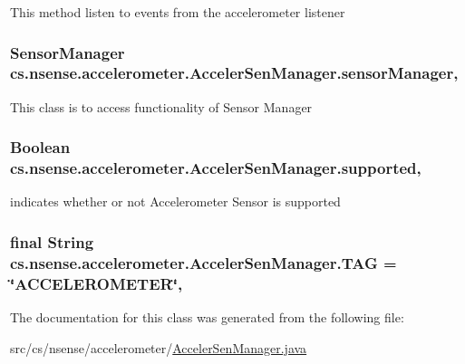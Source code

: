 This method listen to events from the accelerometer listener \hypertarget{classcs_1_1nsense_1_1accelerometer_1_1_acceler_sen_manager_a7a38912fd6f45a8d2ae42711505a1191}{
\subsubsection[{sensor\-Manager}]{\setlength{\rightskip}{0pt plus 5cm}Sensor\-Manager cs.\-nsense.\-accelerometer.\-Acceler\-Sen\-Manager.\-sensor\-Manager\hspace{0.3cm}{\ttfamily [static]}, {\ttfamily [private]}}}\label{classcs_1_1nsense_1_1accelerometer_1_1_acceler_sen_manager_a7a38912fd6f45a8d2ae42711505a1191}
This class is to access functionality of Sensor Manager \hypertarget{classcs_1_1nsense_1_1accelerometer_1_1_acceler_sen_manager_a9c170f7b3bb6edb7f36540f22e815229}{
\subsubsection[{supported}]{\setlength{\rightskip}{0pt plus 5cm}Boolean cs.\-nsense.\-accelerometer.\-Acceler\-Sen\-Manager.\-supported\hspace{0.3cm}{\ttfamily [static]}, {\ttfamily [private]}}}\label{classcs_1_1nsense_1_1accelerometer_1_1_acceler_sen_manager_a9c170f7b3bb6edb7f36540f22e815229}
indicates whether or not Accelerometer Sensor is supported \hypertarget{classcs_1_1nsense_1_1accelerometer_1_1_acceler_sen_manager_ad669f18249fb29b582aa9c4850feb496}{
\subsubsection[{T\-A\-G}]{\setlength{\rightskip}{0pt plus 5cm}final String cs.\-nsense.\-accelerometer.\-Acceler\-Sen\-Manager.\-T\-A\-G = \char`\"{}A\-C\-C\-E\-L\-E\-R\-O\-M\-E\-T\-E\-R\char`\"{}\hspace{0.3cm}{\ttfamily [static]}, {\ttfamily [private]}}}\label{classcs_1_1nsense_1_1accelerometer_1_1_acceler_sen_manager_ad669f18249fb29b582aa9c4850feb496}


The documentation for this class was generated from the following file\-:\begin{DoxyCompactItemize}
\item 
src/cs/nsense/accelerometer/\hyperlink{_acceler_sen_manager_8java}{Acceler\-Sen\-Manager.\-java}\end{DoxyCompactItemize}
